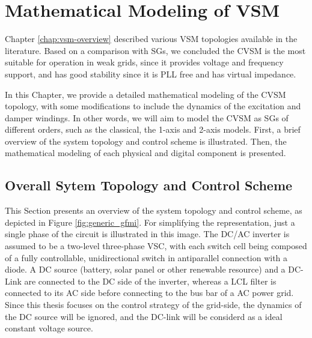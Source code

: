 \chapter{Mathematical Modeling of VSM}\label{chap:vsm-modeling}

Chapter \ref{chap:vsm-overview} described various VSM topologies available in
the literature. Based on a comparison with SGs, we concluded the CVSM is the  
most suitable for operation in weak grids, since it provides voltage and
frequency support, and has good stability since it is PLL free and has virtual
impedance. 

In this Chapter, we provide a detailed mathematical modeling of the CVSM
topology, with some modifications to include the dynamics of the excitation and
damper windings. In other words, we will aim to model the CVSM as SGs of
different orders, such as the classical, the 1-axis and 2-axis models. First, a
brief overview of the system topology and control scheme is illustrated. Then,
the mathematical modeling of each physical and digital component is presented.

\section{Overall Sytem Topology and Control Scheme}

This Section presents an overview of the system topology and control scheme, as
depicted in Figure \ref{fig:generic_gfmi}. For simplifying the representation,
just a single phase of the circuit is illustrated in this image. The DC/AC
inverter is assumed to be a two-level three-phase VSC, with each switch cell
being composed of a fully controllable, unidirectional switch in antiparallel
connection with a diode. A DC source (battery, solar panel or other renewable
resource) and a DC-Link are connected to the DC side of the inverter, whereas a
LCL filter is connected to its AC side before connecting to the bus bar of a AC
power grid. Since this thesis focuses on the control strategy of the grid-side,
the dynamics of the DC source will be ignored, and the DC-link will be considerd
as a ideal constant voltage source.

